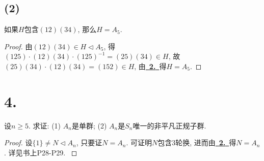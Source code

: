 \documentclass[12pt, a4paper, fontset=windows]{ctexart}
\newcommand{\myref}[2][]{\hyperref[#1]{\color{blue}\ {#2}\ }}
\begin{document}
\subsection*{(2)}

如果$H$包含$(12)(34)$, 那么$H=A_5$. 

\begin{proof}
由$(12)(34)\in H\lhd A_5$, 得$(125)\cdot(12)(34)\cdot(125)^{-1}=(25)(34)\in H$, 
故$(25)(34)\cdot(12)(34)=(152)\in H$, 由\myref[tri-An]{\bf 2.}得$H=A_5$. 
\end{proof}

\section*{4.}

设$n\ge 5$. 求证: (1) $A_n$是单群; (2) $A_n$是$S_n$唯一的非平凡正规子群. 

\begin{proof}
设$\{1\}\ne N\lhd A_n$, 只要证$N=A_n$. 可证明$N$包含3轮换, 
进而由\myref[tri-An]{\bf 2.}得$N=A_n$. 详见书上P28-P29. \cite{jsds}
\end{proof}
\end{document}
